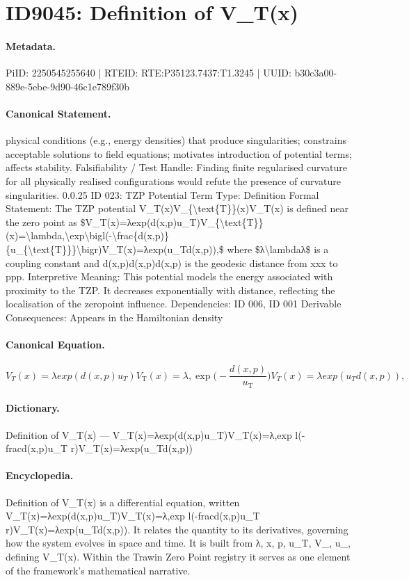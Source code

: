 \section*{ID9045: Definition of V\_T(x)}
\paragraph{Metadata.}
PiID: 2250545255640 | RTEID: RTE:P35123.7437:T1.3245 | UUID: b30c3a00-889e-5ebe-9d90-46c1e789f30b

\paragraph{Canonical Statement.}
physical conditions (e.g., energy densities) that produce singularities; constrains acceptable solutions to field equations; motivates introduction of potential terms; affects stability. Falsifiability / Test Handle: Finding finite regularised curvature for all physically realised configurations would refute the presence of curvature singularities. 0.0.25 ID 023: TZP Potential Term Type: Definition Formal Statement: The TZP potential V\_T(x)V\_\{\textbackslash{}text\{T\}\}(x)V\_T(x) is defined near the zero point as \$V\_T(x)=λexp(d(x,p)u\_T)V\_\{\textbackslash{}text\{T\}\}(x)=\textbackslash{}lambda,\textbackslash{}exp\textbackslash{}bigl(-\textbackslash{}frac\{d(x,p)\}\{u\_\{\textbackslash{}text\{T\}\}\}\textbackslash{}bigr)V\_T(x)=λexp(u\_Td(x,p)),\$ where \$λ\textbackslash{}lambdaλ\$ is a coupling constant and d(x,p)d(x,p)d(x,p) is the geodesic distance from xxx to ppp. Interpretive Meaning: This potential models the energy associated with proximity to the TZP. It decreases exponentially with distance, reflecting the localisation of the zeropoint influence. Dependencies: ID 006, ID 001 Derivable Consequences: Appears in the Hamiltonian density

\paragraph{Canonical Equation.}
\[
V_T(x)=λexp(d(x,p)u_T)V_{\text{T}}(x)=\lambda,\exp\bigl(-\frac{d(x,p)}{u_{\text{T}}}\bigr)V_T(x)=λexp(u_Td(x,p)),
\]

\paragraph{Dictionary.}
Definition of V\_T(x) — V\_T(x)=λexp(d(x,p)u\_T)V\_T(x)=λ,exp l(-fracd(x,p)u\_T r)V\_T(x)=λexp(u\_Td(x,p))

\paragraph{Encyclopedia.}
Definition of V\_T(x) is a differential equation, written V\_T(x)=λexp(d(x,p)u\_T)V\_T(x)=λ,exp l(-fracd(x,p)u\_T r)V\_T(x)=λexp(u\_Td(x,p)). It relates the quantity to its derivatives, governing how the system evolves in space and time. It is built from λ, x, p, u\_T, V\_, u\_, defining V\_T(x). Within the Trawin Zero Point registry it serves as one element of the framework's mathematical narrative.
